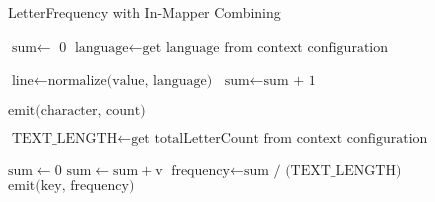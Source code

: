 \begin{algorithm}
    \caption{LetterFrequency with In-Mapper Combining}
    
    \begin{algorithmic}[1]
        \State $\text{sum} \gets$ 0 
        \State $\text{language} \gets \text{get language from context configuration}$

        \EndMethod
    
        \Statex
        \State $\text{line} \gets \text{normalize(value, language)}$ 
            \State $\text{sum} \gets \text{sum + 1}$
        \EndFor
        \EndMethod
    
        \Statex
        
            \State $\text{emit(character, count)}$
        \EndFor
        \EndMethod
    \EndClass
    \end{algorithmic}
    
   
    
    \vspace{0.5cm}

    \begin{algorithmic}[1]
        \State $\text{TEXT\_LENGTH} \gets \text{get totalLetterCount from context configuration}$

        \EndMethod
    
        \Statex
            \State $\text{sum} \gets 0$
                \State $\text{sum} \gets \text{sum} + \text{v}$
            \EndFor
            \State  $\text{frequency} \gets \text{sum / (TEXT\_LENGTH)}$
            \State $\text{emit(key, frequency)}$
        \EndMethod
    \EndClass
    \end{algorithmic}
    
    \end{algorithm}












